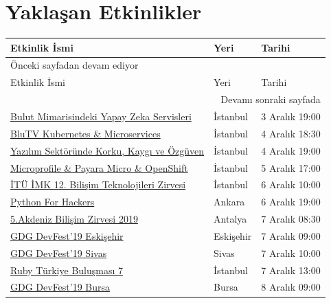 \documentclass[11pt]{article}
\begin{document}
\section{Yaklaşan Etkinlikler}
\label{sec:org8619f7a}
\begin{longtable}{|p{8cm}|l|l|}
\hline
Etkinlik İsmi & Yeri & Tarihi\\
\hline
\endfirsthead
\multicolumn{3}{l}{Önceki sayfadan devam ediyor} \\
\hline

Etkinlik İsmi & Yeri & Tarihi \\

\hline
\endhead
\hline\multicolumn{3}{r}{Devamı sonraki sayfada} \\
\endfoot
\endlastfoot
\hline
\href{https://www.eventbrite.com/e/bulut-mimarisindeki-yapay-zeka-servisleri-registration-83943492245}{Bulut Mimarisindeki Yapay Zeka Servisleri} & İstanbul & 3 Aralık 19:00\\
\href{https://kommunity.com/devops-turkiye/events/blutv-kubernetes-microservices}{BluTV Kubernetes \& Microservices} & İstanbul & 4 Aralık 18:30\\
\href{https://kommunity.com/software-craftsmanship-turkey/events/yazilim-sektorunde-korku-kaygi-ve-ozguven}{Yazılım Sektöründe Korku, Kaygı ve Özgüven} & İstanbul & 4 Aralık 19:00\\
\href{https://kommunity.com/sovos-foriba-rd/events/microprofile-payara-micro-openshift}{Microprofile \& Payara Micro \& OpenShift} & İstanbul & 5 Aralık 17:00\\
\href{https://btz.org.tr/}{İTÜ İMK 12. Bilişim Teknolojileri Zirvesi} & İstanbul & 6 Aralık 10:00\\
\href{https://www.eventbrite.com/e/python-for-hackers-hacknightsorg-tickets-78151145179}{Python For Hackers} & Ankara & 6 Aralık 19:00\\
\href{http://www.akdenizbilisimzirvesi.com/}{5.Akdeniz Bilişim Zirvesi 2019} & Antalya & 7 Aralık 08:30\\
\href{https://www.meetup.com/tr-TR/gdgeskisehir/events/265590646/}{GDG DevFest'19 Eskişehir} & Eskişehir & 7 Aralık 09:00\\
\href{https://www.meetup.com/tr-TR/GDGSivas/events/265339155/}{GDG DevFest'19 Sivas} & Sivas & 7 Aralık 10:00\\
\href{https://kommunity.com/ruby-turkiye/events/ruby-turkiye-bulusmasi-7}{Ruby Türkiye Buluşması 7} & İstanbul & 7 Aralık 13:00\\
\href{https://www.meetup.com/tr-TR/GDGBursa/events/265736999/}{GDG DevFest'19 Bursa} & Bursa & 8 Aralık 09:00\\

\end{longtable}
\end{document}

